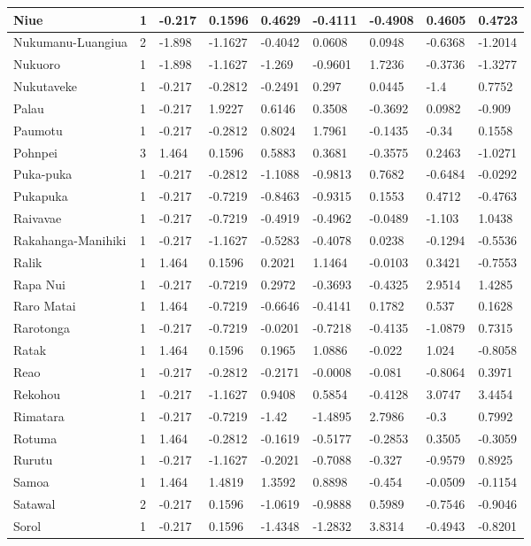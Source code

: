 \documentclass[a4paper,10pt]{article} %
\begin{document}
\begin{landscape}
\begin{longtable}{| p{2.6cm} |  p{1cm} | p{1.2cm}  | p{1.9cm}  | p{1.7cm}  | p{1.7cm}  | p{1.7cm}  | p{1.6cm} | p{1.5cm}   |}
Niue&1&-0.217&0.1596&0.4629&-0.4111&-0.4908&0.4605&0.4723\\ \hline
Nukumanu-Luangiua&2&-1.898&-1.1627&-0.4042&0.0608&0.0948&-0.6368&-1.2014\\ \hline
Nukuoro&1&-1.898&-1.1627&-1.269&-0.9601&1.7236&-0.3736&-1.3277\\ \hline
Nukutaveke&1&-0.217&-0.2812&-0.2491&0.297&0.0445&-1.4&0.7752\\ \hline
Palau&1&-0.217&1.9227&0.6146&0.3508&-0.3692&0.0982&-0.909\\ \hline
Paumotu&1&-0.217&-0.2812&0.8024&1.7961&-0.1435&-0.34&0.1558\\ \hline
Pohnpei&3&1.464&0.1596&0.5883&0.3681&-0.3575&0.2463&-1.0271\\ \hline
Puka-puka&1&-0.217&-0.2812&-1.1088&-0.9813&0.7682&-0.6484&-0.0292\\ \hline
Pukapuka&1&-0.217&-0.7219&-0.8463&-0.9315&0.1553&0.4712&-0.4763\\ \hline
Raivavae&1&-0.217&-0.7219&-0.4919&-0.4962&-0.0489&-1.103&1.0438\\ \hline
Rakahanga-Manihiki&1&-0.217&-1.1627&-0.5283&-0.4078&0.0238&-0.1294&-0.5536\\ \hline
Ralik&1&1.464&0.1596&0.2021&1.1464&-0.0103&0.3421&-0.7553\\ \hline
Rapa Nui&1&-0.217&-0.7219&0.2972&-0.3693&-0.4325&2.9514&1.4285\\ \hline
Raro Matai&1&1.464&-0.7219&-0.6646&-0.4141&0.1782&0.537&0.1628\\ \hline
Rarotonga&1&-0.217&-0.7219&-0.0201&-0.7218&-0.4135&-1.0879&0.7315\\ \hline
Ratak&1&1.464&0.1596&0.1965&1.0886&-0.022&1.024&-0.8058\\ \hline
Reao&1&-0.217&-0.2812&-0.2171&-0.0008&-0.081&-0.8064&0.3971\\ \hline
Rekohou&1&-0.217&-1.1627&0.9408&0.5854&-0.4128&3.0747&3.4454\\ \hline
Rimatara&1&-0.217&-0.7219&-1.42&-1.4895&2.7986&-0.3&0.7992\\ \hline
Rotuma&1&1.464&-0.2812&-0.1619&-0.5177&-0.2853&0.3505&-0.3059\\ \hline
Rurutu&1&-0.217&-1.1627&-0.2021&-0.7088&-0.327&-0.9579&0.8925\\ \hline
Samoa&1&1.464&1.4819&1.3592&0.8898&-0.454&-0.0509&-0.1154\\ \hline
Satawal&2&-0.217&0.1596&-1.0619&-0.9888&0.5989&-0.7546&-0.9046\\ \hline
Sorol&1&-0.217&0.1596&-1.4348&-1.2832&3.8314&-0.4943&-0.8201\\ \hline

\end{longtable}
\end{landscape}
\end{document}
